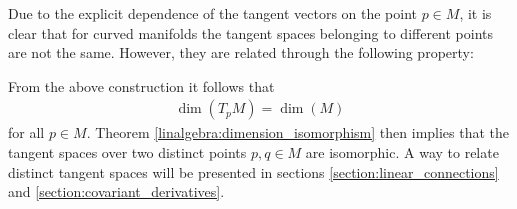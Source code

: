     Due to the explicit dependence of the tangent vectors on the point $p\in M$, it is clear that for curved manifolds the tangent spaces belonging to different points are not the same. However, they are related through the following property:
    \begin{property}
        From the above construction it follows that
        \begin{gather}
            \dim(T_p M)=\dim(M)
        \end{gather}
        for all $p\in M$. Theorem \ref{linalgebra:dimension_isomorphism} then implies that the tangent spaces over two distinct points $p,q\in M$ are isomorphic. A way to relate distinct tangent spaces will be presented in sections \ref{section:linear_connections} and \ref{section:covariant_derivatives}.
    \end{property}

